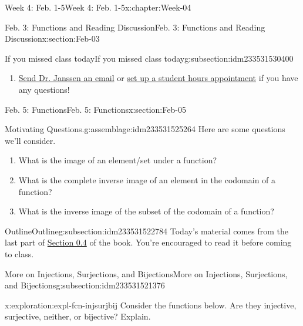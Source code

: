 \documentclass[oneside,10pt,]{book}
\numberwithin{equation}{section}
\begin{document}
\begin{chapterptx}{Week 4: Feb. 1-5}{}{Week 4: Feb. 1-5}{}{}{x:chapter:Week-04}
\begin{sectionptx}{Feb. 3: Functions and Reading Discussion}{}{Feb. 3: Functions and Reading Discussion}{}{}{x:section:Feb-03}
\begin{subsectionptx}{If you missed class today}{}{If you missed class today}{}{}{g:subsection:idm233531530400}
\begin{enumerate}
\item{}\href{mailto:mike.janssen@dordt.edu}{Send Dr. Janssen an email} or \href{https://calendly.com/mkjanssen/student-hours}{set up a student hours appointment} if you have any questions!%
\end{enumerate}
\end{subsectionptx}
\end{sectionptx}
%
%
\typeout{************************************************}
\typeout{************************************************}
%
\begin{sectionptx}{Feb. 5: Functions}{}{Feb. 5: Functions}{}{}{x:section:Feb-05}
\begin{introduction}{}%
\begin{assemblage}{Motivating Questions.}{g:assemblage:idm233531525264}%
Here are some questions we'll consider. %
\begin{enumerate}
\item{}What is the image of an element\slash{}set under a function?%
\item{}What is the complete inverse image of an element in the codomain of a function?%
\item{}What is the inverse image of the subset of the codomain of a function?%
\end{enumerate}
%
\end{assemblage}
\end{introduction}%
%
%
\typeout{************************************************}
\typeout{************************************************}
%
\begin{subsectionptx}{Outline}{}{Outline}{}{}{g:subsection:idm233531522784}
Today's material comes from the last part of \href{http://discrete.openmathbooks.org/dmoi3/sec_intro-functions.html}{Section 0.4} of the book. You're encouraged to read it before coming to class.%
%
%
\typeout{************************************************}
\typeout{************************************************}
%
\begin{subsectionptx}{More on Injections, Surjections, and Bijections}{}{More on Injections, Surjections, and Bijections}{}{}{g:subsection:idm233531521376}
\begin{exploration}{}{x:exploration:expl-fcn-injsurjbij}%
Consider the functions below. Are they injective, surjective, neither, or bijective? Explain.%
%
\begin{enumerate}

\end{enumerate}
\end{exploration}
\end{subsectionptx}
\end{subsectionptx}
\end{sectionptx}
\end{chapterptx}
\end{document}

